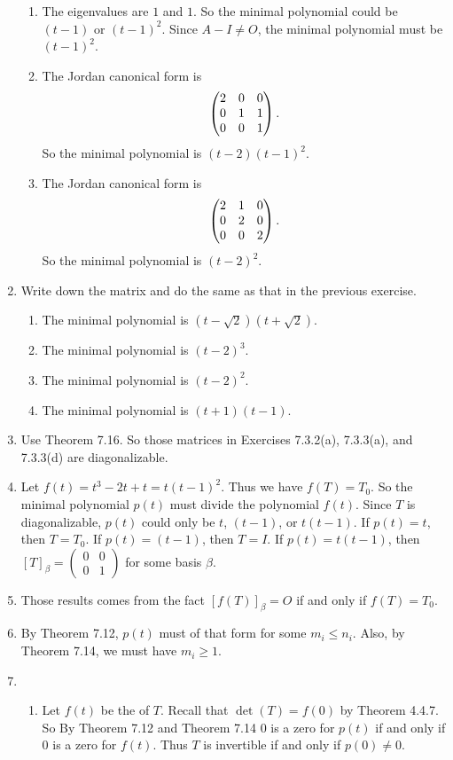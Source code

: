 \begin{enumerate}
\begin{enumerate}
\item The eigenvalues are $1$ and $1$. So the minimal polynomial could be $(t-1)$ or $(t-1)^2$. Since $A-I\neq O$, the minimal polynomial must be $(t-1)^2$.
\item The Jordan canonical form is 
\[\begin{pmatrix}2 & 0 & 0\cr 0 & 1 & 1\cr 0 & 0 & 1\end{pmatrix}.\]
So the minimal polynomial is $(t-2)(t-1)^2$.
\item The Jordan canonical form is 
\[\begin{pmatrix}2 & 1 & 0\cr 0 & 2 & 0\cr 0 & 0 & 2\end{pmatrix}.\]
So the minimal polynomial is $(t-2)^2$.
\end{enumerate}
\item Write down the matrix and do the same as that in the previous exercise.\begin{enumerate}
\item The minimal polynomial is $(t-\sqrt{2})(t+\sqrt{2})$.
\item The minimal polynomial is $(t-2)^3$.
\item The minimal polynomial is $(t-2)^2$.
\item The minimal polynomial is $(t+1)(t-1)$.
\end{enumerate}
\item Use Theorem 7.16. So those matrices in Exercises 7.3.2(a), 7.3.3(a), and 7.3.3(d) are diagonalizable.
\item Let $f(t)=t^3-2t+t=t(t-1)^2$. Thus we have $f(T)=T_0$. So the minimal polynomial $p(t)$ must divide the polynomial $f(t)$. Since $T$ is diagonalizable, $p(t)$ could only be $t$, $(t-1)$, or $t(t-1)$. If $p(t)=t$, then $T=T_0$. If $p(t)=(t-1)$, then $T=I$. If $p(t)=t(t-1)$, then $[T]_{\beta}=\begin{pmatrix}0&0\\0&1\end{pmatrix}$ for some basis $\beta$. 
\item Those results comes from the fact $[f(T)]_{\beta}=O$ if and only if $f(T)=T_0$.
\item By Theorem 7.12, $p(t)$ must of that form for some $m_i\leq n_i$. Also, by Theorem 7.14, we must have $m_i\geq 1$.
\item \begin{enumerate}
\item Let $f(t)$ be the \charpoly{} of $T$. Recall that $\det(T)=f(0)$ by Theorem 4.4.7. So By Theorem 7.12 and Theorem 7.14 $0$ is a zero for $p(t)$ if and only if $0$ is a zero for $f(t)$. Thus $T$ is invertible if and only if $p(0)\neq 0$.

\end{enumerate}
\end{enumerate}
